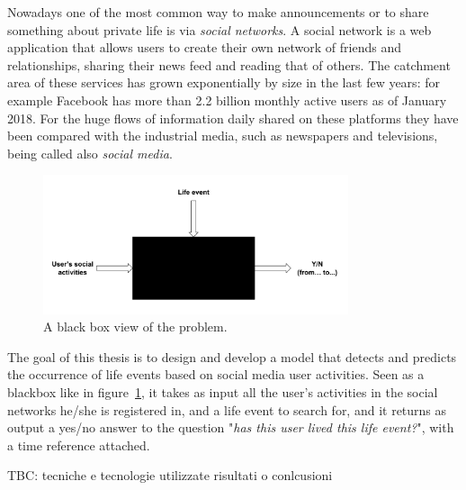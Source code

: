 Nowadays one of the most common way to make announcements or to share something about private life is via \textit{social networks}. A social network is a web application that allows users to create their own network of friends and relationships, sharing their news feed and reading that of others. The 
catchment area of these services has grown exponentially by size in the last few years: for example Facebook has more than 2.2 billion monthly active users as of January 2018. For the huge flows of information daily shared on these platforms they have been compared with the industrial media, such as newspapers and televisions, being called also \textit{social media}.

\begin{figure}
\centering
\includegraphics[width=%
0.8\textwidth]{img/bb}
\caption{A black box view of the problem.}
\label{fig:bb}
\end{figure}

The goal of this thesis is to design and develop a model that detects and predicts the occurrence of life events based on social media user activities. Seen as a blackbox like in figure~\ref{fig:bb}, it takes as input all the user's activities in the social networks he/she is registered in, and a life event to search for, and it returns as output a yes/no answer to the question "\textit{has this user lived this life event?}", with a time reference attached.

TBC: tecniche e tecnologie utilizzate
risultati o conlcusioni


